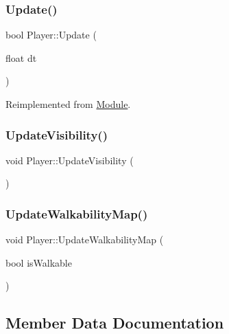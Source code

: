 \mbox{\label{class_player_a637908f123cba18727999783a7534459}} 
\subsubsection{\texorpdfstring{Update()}{Update()}}
{\footnotesize\ttfamily bool Player\+::\+Update (\begin{DoxyParamCaption}\item[{float}]{dt }\end{DoxyParamCaption})\hspace{0.3cm}{\ttfamily [virtual]}}



Reimplemented from \mbox{\hyperlink{class_module_ac1a7b6dca73586b9cce2e67647af58d8}{Module}}.

\mbox{\label{class_player_af46bd7e9f66cbd7c24a1dfb3f7919329}} 
\subsubsection{\texorpdfstring{UpdateVisibility()}{UpdateVisibility()}}
{\footnotesize\ttfamily void Player\+::\+Update\+Visibility (\begin{DoxyParamCaption}{ }\end{DoxyParamCaption})}

\mbox{\label{class_player_a9f6646ebdb0ca639bc568922fc8980a3}} 
\subsubsection{\texorpdfstring{UpdateWalkabilityMap()}{UpdateWalkabilityMap()}}
{\footnotesize\ttfamily void Player\+::\+Update\+Walkability\+Map (\begin{DoxyParamCaption}\item[{bool}]{is\+Walkable }\end{DoxyParamCaption})}



\subsection{Member Data Documentation}
\mbox{\label{class_player_a9af46b03c4d13ce71174c19882d668ff}} 
